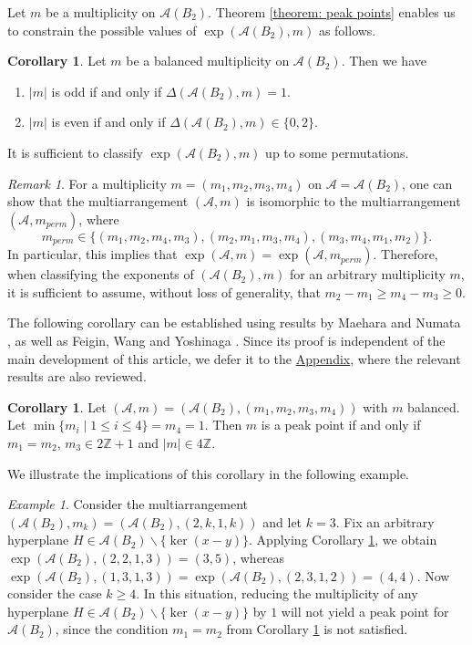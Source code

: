 \documentclass[12pt]{amsart}
\theoremstyle{definition}
\newtheorem{corollary}[theorem]{Corollary}
\theoremstyle{remark}
\newtheorem{example}[theorem]{Example}
\newtheorem{remark}[theorem]{Remark}
\newcommand\CA{{\mathscr A}}
\newcommand\ZZ{{\mathbb Z}}
\begin{document}
Let $m$ be a multiplicity on $\CA(B_2)$. Theorem \ref{theorem: peak points} enables us to constrain the possible values of $\exp(\CA(B_2),m)$ as follows.

\begin{corollary}\label{corollary: deltas for m}
        Let $m$ be a balanced multiplicity on $\CA(B_2)$. Then we have
        \begin{enumerate}
            \item $|m|$ is odd if and only if $\Delta(\CA(B_2),m)=1$.
            \item $|m|$ is even if and only if $\Delta(\CA(B_2),m)\in\{0,2\}$. 
        \end{enumerate}
\end{corollary}

It is sufficient to classify $\exp(\CA(B_2),m)$ up to some permutations.

\begin{remark}\label{remark:permutation}
    For a multiplicity $m=(m_1,m_2,m_3,m_4)$ on $\CA=\CA(B_2)$, 
    one can show that the multiarrangement $(\CA,m)$ is isomorphic to the multiarrangement $(\CA,m_{perm})$, where $$m_{perm}\in\{(m_1,m_2,m_4,m_3), (m_2,m_1,m_3,m_4), (m_3,m_4,m_1,m_2)\}.$$ 
    In particular, this implies that $\exp(\CA,m)=\exp(\CA,m_{perm})$. Therefore, when classifying the exponents of $(\CA(B_2),m)$ for an arbitrary multiplicity $m$, it is sufficient to assume, without loss of generality, that $m_2-m_1 \geq m_4-m_3 \geq 0$.
\end{remark}

The following corollary can be established using results by Maehara and Numata \cite{2312.06356}, as well as Feigin, Wang and Yoshinaga \cite{2309.01287}. Since its proof is independent of the main development of this article, we defer it to the \hyperref[appendix]{Appendix}, where the relevant results are also reviewed.

\begin{corollary}\label{corollary: deletion exponents appendixproof}
    Let $(\CA,m)=(\CA(B_2),(m_1,m_2,m_3,m_4))$ with $m$ balanced. Let $\min\{m_i\mid1\leq i\leq4\}=m_4=1$. Then $m$ is a peak point if and only if $m_1=m_2$, $m_3\in 2\ZZ+1$ and $|m|\in 4\ZZ$. 
\end{corollary}

We illustrate the implications of this corollary in the following example.

\begin{example}\label{example: k equal to 3 is peakpoint}
Consider the multiarrangement $(\CA(B_2),m_k)=(\CA(B_2),(2,k,1,k))$ and let $k=3$. Fix an arbitrary hyperplane $H\in\CA(B_2)\backslash\{\ker(x-y)\}$. Applying Corollary \ref{corollary: deletion exponents appendixproof}, we obtain $\exp(\CA(B_2),(2,2,1,3))=(3,5)$, whereas $\exp(\CA(B_2),(1,3,1,3))=\exp(\CA(B_2),(2,3,1,2))=(4,4)$.
Now consider the case $k\geq 4$. In this situation, reducing the multiplicity of any hyperplane $H\in\CA(B_2)\backslash\{\ker(x-y)\}$ by $1$ will not yield a peak point for $\CA(B_2)$, since the condition $m_1=m_2$ from Corollary \ref{corollary: deletion exponents appendixproof} is not satisfied.
\end{example}
    
\end{document}
